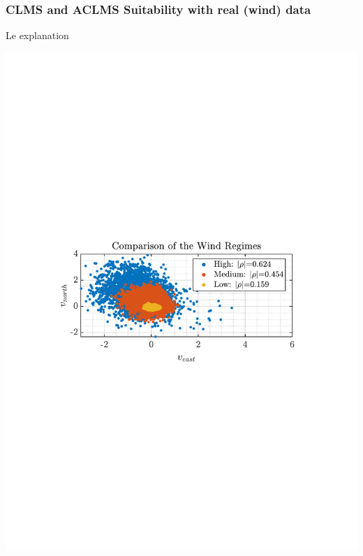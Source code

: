 \documentclass[12pt]{article}
\begin{document}
		\subsubsection{CLMS and ACLMS Suitability with real (wind) data}
			\begin{minipage}[b]{0.49\textwidth}
				Le explanation
			\end{minipage}%
			\begin{minipage}{0.04\textwidth}
				\hspace*{0.04\textwidth}
			\end{minipage}%
			\begin{minipage}{0.49\textwidth}
				\centering
				\includegraphics[trim={2.2cm 11.2cm 3.15cm  11.2cm}, clip, width=\textwidth]{../MATLAB/figures/q3_1b_fig04.pdf} 
				

\end{minipage}
\end{document}
